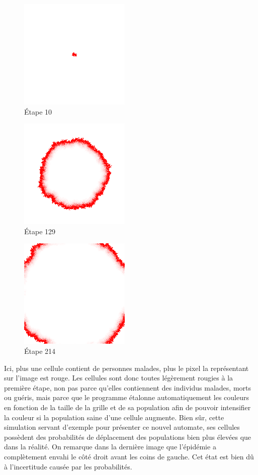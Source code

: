 \documentclass{article}
\begin{document}
\begin{figure}[H]
\caption{Étape 10}
\centering
\includegraphics[scale=1]{../images/10_malades.png}
\end{figure}

\begin{figure}[H]
\caption{Étape 129}
\centering
\includegraphics[scale=1]{../images/129_malades.png}
\end{figure}

\begin{figure}[H]
\caption{Étape 214}
\centering
\includegraphics[scale=1]{../images/214_malades.png}
\end{figure}


Ici, plus une cellule contient de personnes malades, plus le pixel la représentant sur l'image est rouge. Les cellules sont donc toutes légèrement rougies à la première étape, non pas parce qu'elles contiennent des individus malades, morts ou guéris, mais parce que le programme étalonne automatiquement les couleurs en fonction de la taille de la grille et de sa population afin de pouvoir intensifier la couleur si la population saine d'une cellule augmente.
Bien sûr, cette simulation servant d'exemple pour présenter ce nouvel automate, ses cellules possèdent des probabilités de déplacement des populations bien plus élevées que dans la réalité.
On remarque dans la dernière image que l'épidémie a complètement envahi le côté droit avant les coins de gauche. Cet état est bien dû à l'incertitude causée par les probabilités.
\end{document}
